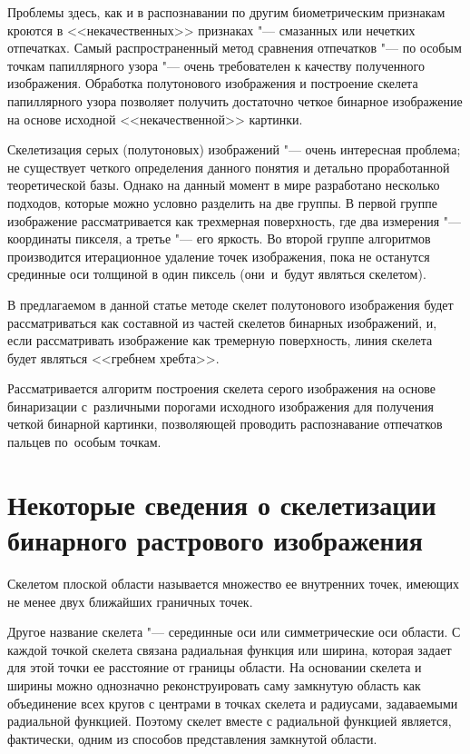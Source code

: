 \documentclass[twoside]{article}
\begin{document}
Проблемы здесь, как и в распознавании по другим биометрическим признакам кроются в <<некачественных>> признаках "--- смазанных или нечетких отпечатках. Самый распространенный метод сравнения отпечатков "--- по особым точкам папиллярного узора "--- очень требователен к качеству полученного изображения. Обработка полутонового изображения и построение скелета папиллярного узора позволяет получить достаточно четкое бинарное изображение на основе исходной <<некачественной>> картинки.

Скелетизация серых (полутоновых) изображений "--- очень интересная проблема; не существует четкого определения данного понятия и детально проработанной теоретической базы. Однако на данный момент в мире разработано несколько подходов, которые можно условно разделить на две группы. В первой группе изображение рассматривается как трехмерная поверхность, где два измерения "--- координаты пикселя, а третье "--- его яркость. Во второй группе алгоритмов производится итерационное удаление точек изображения, пока не останутся срединные оси толщиной в один пиксель (они~и~будут являться скелетом).

В предлагаемом в данной статье методе скелет полутонового изображения будет рассматриваться как составной из частей скелетов бинарных изображений, и, если рассматривать изображение как тремерную поверхность, линия скелета будет являться <<гребнем хребта>>.

Рассматривается алгоритм построения скелета серого изображения на основе бинаризации с~различными порогами исходного изображения для получения четкой бинарной картинки, позволяющей проводить распознавание отпечатков пальцев по~особым точкам.

\section{Некоторые сведения о скелетизации бинарного растрового изображения}
Скелетом плоской области называется множество ее внутренних точек, имеющих не менее двух ближайших граничных точек.

Другое название скелета "--- серединные оси или симметрические оси области. С каждой точкой скелета связана радиальная функция или ширина, которая задает для этой точки ее расстояние от границы области. На основании скелета и ширины можно однозначно реконструировать саму замкнутую область как объединение всех кругов с центрами в точках скелета и радиусами, задаваемыми радиальной функцией. Поэтому скелет вместе с радиальной функцией является, фактически, одним из способов представления замкнутой области.
\end{document}
